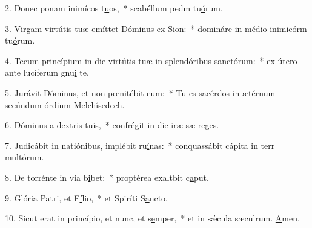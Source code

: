 2. Donec ponam inimícos t\uline{u}os,~* scabéllum pedm tu\uline{ó}rum.\par 
3. Virgam virtútis tuæ emíttet Dóminus ex S\uline{i}on:~* domináre in médio inimicórm tu\uline{ó}rum.\par 
4. Tecum princípium in die virtútis tuæ in splendóribus sanct\uline{ó}rum:~* ex útero ante lucíferum gnu\uline{i} te.\par 
5. Jurávit Dóminus, et non pœnitébit \uline{e}um:~* Tu es sacérdos in ætérnum secúndum órdinm Melch\uline{í}sedech.\par 
6. Dóminus a dextris t\uline{u}is,~* confrégit in die iræ sæ r\uline{e}ges.\par 
7. Judicábit in natiónibus, implébit ru\uline{í}nas:~* conquassábit cápita in terr mult\uline{ó}rum.\par 
8. De torrénte in via b\uline{i}bet:~* proptérea exaltbit c\uline{a}put.\par 
9. Glória Patri, et F\uline{í}lio,~* et Spiríti S\uline{a}ncto.\par 
10. Sicut erat in princípio, et nunc, et s\uline{e}mper,~* et in sǽcula sæculrum. \uline{A}men.\par 
